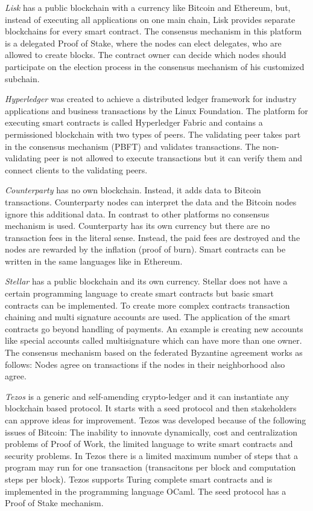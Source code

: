 \documentclass[conference]{IEEEtran}
\begin{document}
\textit{Lisk} has a public blockchain with a currency like Bitcoin and Ethereum, but, instead of executing all applications on one main chain, Lisk provides separate blockchains for every smart contract. The consensus mechanism in this platform is a delegated Proof of Stake, where the nodes can elect delegates, who are allowed to create blocks. The contract owner can decide which nodes should participate on the election process in the consensus mechanism of his customized subchain.  \cite{Bartoletti2017} \par 
\textit{Hyperledger} was created to achieve a distributed ledger framework for industry applications and business transactions by the Linux Foundation. The platform for executing smart contracts is called Hyperledger Fabric and contains a permissioned blockchain with two types of peers. The validating peer takes part in the consensus mechanism (PBFT) and validates transactions. The non-validating peer is not allowed to execute transactions but it can verify them and connect clients to the validating peers. \cite{Cachin2016} \par 
\textit{Counterparty} has no own blockchain. Instead, it adds data to Bitcoin transactions. Counterparty nodes can interpret the data and the Bitcoin nodes ignore this additional data. In contrast to other platforms no consensus mechanism is used. Counterparty has its own currency but there are no transaction fees in the literal sense. Instead, the paid fees are destroyed and the nodes are rewarded by the inflation (proof of burn). Smart contracts can be written in the same languages like in Ethereum. \cite{Bartoletti2017} \par 
\textit{Stellar} has a public blockchain and its own currency. Stellar does not have a certain programming language to create smart contracts but basic smart contracts can be implemented. To create more complex contracts transaction chaining and multi signature accounts are used. The application of the smart contracts go beyond handling of payments. An example is creating new accounts like special accounts called multisignature which can have more than one owner. The consensus mechanism based on the federated Byzantine agreement works as follows: Nodes agree on transactions if the nodes in their neighborhood also agree. \cite{Bartoletti2017} \par 
\textit{Tezos} is a generic and self-amending crypto-ledger and it can instantiate any blockchain based protocol. It starts with a seed protocol and then stakeholders can approve ideas for improvement. Tezos was developed because of the following issues of Bitcoin: The inability to innovate dynamically, cost and centralization problems of Proof of Work, the limited language to write smart contracts and security problems. In Tezos there is a limited maximum number of steps that a program may run for one transaction (transacitons per block and computation steps per block). Tezos supports Turing complete smart contracts and is implemented in the programming language OCaml. The seed protocol has a Proof of Stake mechanism. \cite{Goodman2014} \cite{Goodman2014a} \par
\end{document}
